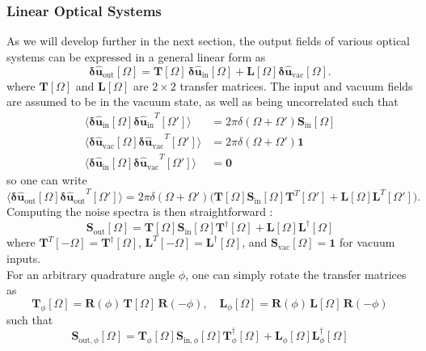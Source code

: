 \subsubsection{Linear Optical Systems}
As we will develop further in the next section, the output fields of various optical systems can be expressed in a general linear form as
\begin{equation}
\mathbf{\delta \hat{u}_{\mathrm{out}}}[\Omega]
=
\mathbf{T}[\Omega] \, \mathbf{\delta \hat{u}_{\mathrm{in}}}[\Omega]
+ \mathbf{L}[\Omega]  \mathbf{\delta \hat{u}_{\mathrm{vac}}}[\Omega].
\end{equation}
where $\mathbf{T}[\Omega]$ and $\mathbf{L}[\Omega]$ are $2\times 2$ transfer matrices. The input and vacuum fields are assumed to be in the vacuum state, as well as being uncorrelated such that 
\begin{equation}
  \begin{split}
    \langle \mathbf{\delta \hat{u}_{\mathrm{in}}}[\Omega]  \mathbf{\delta \hat{u}_{\mathrm{in}}}^{T}[\Omega'] \rangle & = 2\pi \delta(\Omega+\Omega')\mathbf{S}_{\mathrm{in}}[\Omega]  \\
    \langle \mathbf{\delta \hat{u}_{\mathrm{vac}}}[\Omega]  \mathbf{\delta \hat{u}_{\mathrm{vac}}}^{T}[\Omega'] \rangle &=  2\pi \delta(\Omega+\Omega')\mathbf{1}  \\
    \langle \mathbf{\delta \hat{u}_{\mathrm{in}}}[\Omega]  \mathbf{\delta \hat{u}_{\mathrm{vac}}}^{T}[\Omega'] \rangle &= \mathbf{0}
  \end{split}
\end{equation}
so one can write 
\begin{equation}
  \langle \mathbf{\delta \hat{u}_{\mathrm{out}}}[\Omega]  \mathbf{\delta \hat{u}_{\mathrm{out}}}^{T}[\Omega'] \rangle =2\pi \delta(\Omega+\Omega') \Big(\mathbf{T}[\Omega] \mathbf{S}_{\mathrm{in}}[\Omega] \mathbf{T}^{T}[\Omega'] + \mathbf{L}[\Omega] \mathbf{L}^{T}[\Omega']\Big).
\end{equation}
Computing the noise spectra is then straightforward : 
\begin{equation}
  \mathbf{S}_{\mathrm{out}}[\Omega] = \mathbf{T}[\Omega] \mathbf{S}_{\mathrm{in}}[\Omega] \mathbf{T}^{\dagger}[\Omega] + \mathbf{L}[\Omega] \mathbf{L}^{\dagger}[\Omega] 
\end{equation}
where $\mathbf{T}^{T}[-\Omega] = \mathbf{T}^{\dagger}[\Omega]$, $\mathbf{L}^{T}[-\Omega] = \mathbf{L}^{\dagger}[\Omega]$, and $\mathbf{S}_{\mathrm{vac}}[\Omega] = \mathbf{1}$ for vacuum inputs.\\
For an arbitrary quadrature angle $\phi$, one can simply rotate the transfer matrices as
\begin{equation}
  \mathbf{T}_\phi[\Omega] = \mathbf{R}(\phi) \, \mathbf{T}[\Omega] \, \mathbf{R}(-\phi), \quad
  \mathbf{L}_\phi[\Omega] = \mathbf{R}(\phi) \, \mathbf{L}[\Omega] \, \mathbf{R}(-\phi)
\end{equation}
such that
\begin{equation}
  \mathbf{S}_{\mathrm{out}, \phi}[\Omega] = \mathbf{T}_\phi[\Omega] \mathbf{S}_{\mathrm{in}, \phi}[\Omega] \mathbf{T}_\phi^{\dagger}[\Omega] + \mathbf{L}_\phi[\Omega] \mathbf{L}_\phi^{\dagger}[\Omega]
\end{equation}



